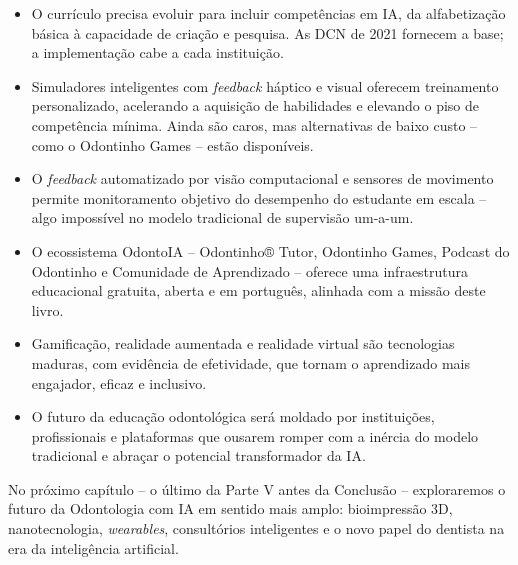 \begin{itemize}
  \item O currículo precisa evoluir para incluir competências em IA, da
    alfabetização básica à capacidade de criação e pesquisa. As DCN de 2021
    fornecem a base; a implementação cabe a cada instituição.

  \item Simuladores inteligentes com \textit{feedback} háptico e visual
    oferecem treinamento personalizado, acelerando a aquisição de habilidades
    e elevando o piso de competência mínima. Ainda são caros, mas alternativas
    de baixo custo -- como o Odontinho Games -- estão disponíveis.

  \item O \textit{feedback} automatizado por visão computacional e sensores de
    movimento permite monitoramento objetivo do desempenho do estudante em
    escala -- algo impossível no modelo tradicional de supervisão um-a-um.

  \item O ecossistema OdontoIA -- Odontinho® Tutor, Odontinho Games, Podcast do
    Odontinho e Comunidade de Aprendizado -- oferece uma infraestrutura
    educacional gratuita, aberta e em português, alinhada com a missão deste
    livro.

  \item Gamificação, realidade aumentada e realidade virtual são tecnologias
    maduras, com evidência de efetividade, que tornam o aprendizado mais
    engajador, eficaz e inclusivo.

  \item O futuro da educação odontológica será moldado por instituições,
    profissionais e plataformas que ousarem romper com a inércia do modelo
    tradicional e abraçar o potencial transformador da IA.
\end{itemize}


No próximo capítulo -- o último da Parte V antes da Conclusão -- exploraremos
o futuro da Odontologia com IA em sentido mais amplo: bioimpressão 3D,
nanotecnologia, \textit{wearables}, consultórios inteligentes e o novo papel do
dentista na era da inteligência artificial.

\endinput
